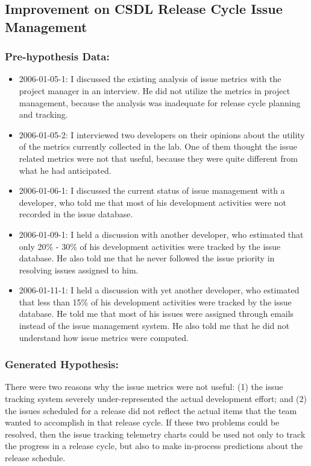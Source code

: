 \subsection{Improvement on CSDL Release Cycle Issue Management}
\label{EvaluationInCSDL:EventsDescription:ProjectIssueTracking}

\subsubsection{Pre-hypothesis Data:}
\begin{itemize}
  \setlength{\itemsep}{0pt}
  \setlength{\parskip}{0pt}
  \item 2006-01-05-1: I discussed the existing analysis of issue metrics with the project manager in an interview. He did not utilize the metrics in project management, because the analysis was inadequate for release cycle planning and tracking. 
	\item 2006-01-05-2: I interviewed two developers on their opinions about the utility of the metrics currently collected in the lab. One of them thought the issue related metrics were not that useful, because they were quite different from what he had anticipated. 
	\item 2006-01-06-1: I discussed the current status of issue management with a developer, who told me that most of his development activities were not recorded in the issue database.
	\item 2006-01-09-1: I held a discussion with another developer, who estimated that only 20\% - 30\% of his development activities were tracked by the issue database. He also told me that he never followed the issue priority in resolving issues assigned to him.
	\item 2006-01-11-1: I held a discussion with yet another developer, who estimated that less than 15\% of his development activities were tracked by the issue database. He told me that most of his issues were assigned through emails instead of the issue management system. He also told me that he did not understand how issue metrics were computed.
\end{itemize}
	
\subsubsection{Generated Hypothesis:}
There were two reasons why the issue metrics were not useful: (1) the issue tracking system severely under-represented the actual development effort; and (2) the issues scheduled for a release did not reflect the actual items that the team wanted to accomplish in that release cycle. If these two problems could be resolved, then the issue tracking telemetry charts could be used not only to track the progress in a release cycle, but also to make in-process predictions about the release schedule. 

